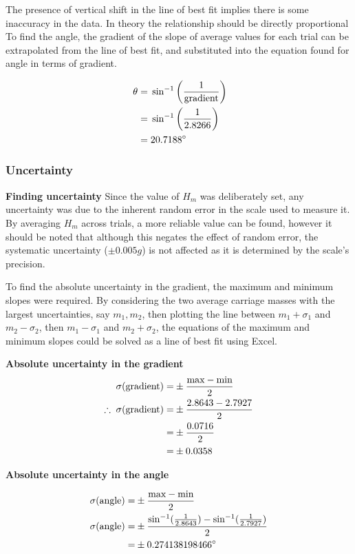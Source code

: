 \documentclass[11pt,a4paper]{article}
\begin{document}
The presence of vertical shift in the line of best fit implies there is some inaccuracy in the data. In theory the relationship should be directly proportional
To find the angle, the gradient of the slope of average values for each trial can be extrapolated from the line of best fit, and substituted into the equation found for angle in terms of gradient.

\begin{align*}
\centering
\;\theta=&\;\sin^{-1}\left(\frac{1}{\textrm{gradient}}\right)\\
 =& \;\sin^{-1}\left(\frac{1}{2.8266}\right)\\
	=&\;20.7188^\circ
\end{align*}

\subsubsection{Uncertainty}

{\large \textbf{Finding uncertainty}\newline}
Since the value of $H_m$ was deliberately set, any uncertainty was due to the inherent random error in the scale used to measure it. By averaging $H_m$ across trials, a more reliable value can be found, however it should be noted that although this negates the effect of random error, the systematic uncertainty ($\pm0.005g$) is not affected as it is determined by the scale's precision.

To find the absolute uncertainty in the gradient, the maximum and minimum slopes were required. By considering the two average carriage masses with the largest uncertainties, say $m_1, m_2$, then plotting the line between $m_1+\sigma_1$ and $m_2-\sigma_2$, then  $m_1-\sigma_1$ and $m_2+\sigma_2$, the equations of the maximum and minimum slopes could be solved as a line of best fit using Excel.
\begin{center}
	\textbf{Absolute uncertainty in the gradient}
	\begin{align*}
		\centering
		\sigma(\textrm{gradient})=&\pm\frac{\textrm{max}-\textrm{min}}{2}\\
		\therefore\;\sigma(\textrm{gradient})=&\pm\frac{2.8643-2.7927}{2}\\
		=&\pm\frac{0.0716}{2}\\
		=&\pm0.0358
	\end{align*}
	
	\textbf{Absolute uncertainty in the angle}
	
	\begin{align*}
		\centering
		\sigma(\textrm{angle})=&\pm\frac{\textrm{max}-\textrm{min}}{2}\\
		\sigma(\textrm{angle})=&\pm\frac{\sin^{-1}(\frac{1}{2.8643})-\sin^{-1}(\frac{1}{2.7927})}{2}\\
		=&\pm0.274138198466^\circ 
	\end{align*}
	
\end{center}
\hfill
\end{document}
